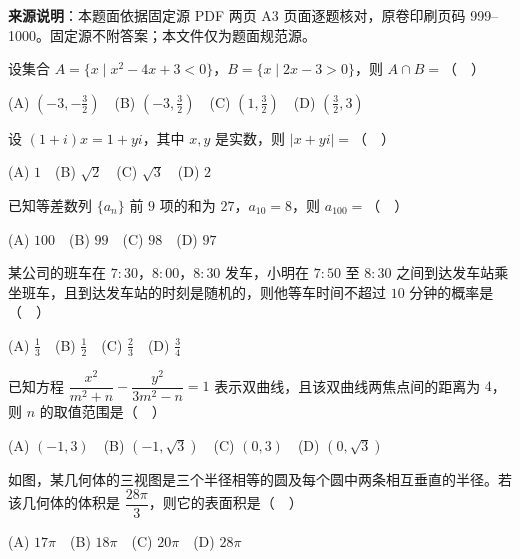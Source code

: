 


\begin{gktip}
\textbf{来源说明}：本题面依据固定源 PDF 两页 A3 页面逐题核对，原卷印刷页码 999–1000。固定源不附答案；本文件仅为题面规范源。
\end{gktip}


\begin{question}
设集合 $A=\{x\mid x^2-4x+3<0\}$，$B=\{x\mid 2x-3>0\}$，则 $A\cap B=$（　）

   (A) $(-3,-\frac32)$　(B) $(-3,\frac32)$　(C) $(1,\frac32)$　(D) $(\frac32,3)$

\end{question}
\begin{question}
设 $(1+i)x=1+yi$，其中 $x,y$ 是实数，则 $|x+yi|=$（　）

   (A) $1$　(B) $\sqrt2$　(C) $\sqrt3$　(D) $2$

\end{question}
\begin{question}
已知等差数列 $\{a_n\}$ 前 $9$ 项的和为 $27$，$a_{10}=8$，则 $a_{100}=$（　）

   (A) $100$　(B) $99$　(C) $98$　(D) $97$

\end{question}
\begin{question}
某公司的班车在 $7{:}30$，$8{:}00$，$8{:}30$ 发车，小明在 $7{:}50$ 至 $8{:}30$ 之间到达发车站乘坐班车，且到达发车站的时刻是随机的，则他等车时间不超过 $10$ 分钟的概率是（　）

   (A) $\frac13$　(B) $\frac12$　(C) $\frac23$　(D) $\frac34$

\end{question}
\begin{question}
已知方程 $\dfrac{x^2}{m^2+n}-\dfrac{y^2}{3m^2-n}=1$ 表示双曲线，且该双曲线两焦点间的距离为 $4$，则 $n$ 的取值范围是（　）

   (A) $(-1,3)$　(B) $(-1,\sqrt3)$　(C) $(0,3)$　(D) $(0,\sqrt3)$

\Needspace{0.4\textheight}
\end{question}
\begin{question}
如图，某几何体的三视图是三个半径相等的圆及每个圆中两条相互垂直的半径。若该几何体的体积是 $\dfrac{28\pi}{3}$，则它的表面积是（　）

   (A) $17\pi$　(B) $18\pi$　(C) $20\pi$　(D) $28\pi$
\nopagebreak[4]
\begin{center}\end{center}
\nopagebreak[4]
\Needspace{0.4\textheight}
\end{question}
